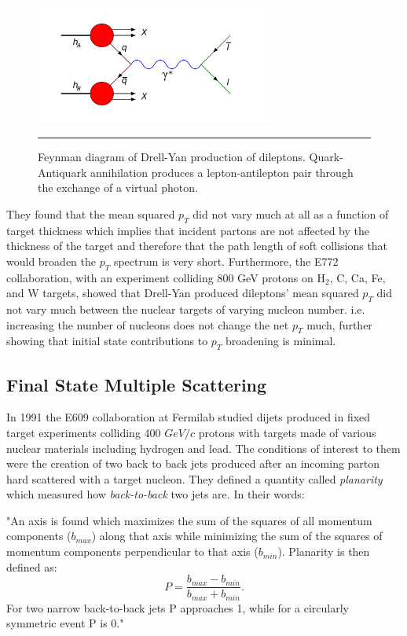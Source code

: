 \begin{figure}[htbp!]
  \centering
    \includegraphics[width=0.7\textwidth]{Figures/DYfeynman.png}
    \rule{35em}{0.5pt}
  \caption[Feynman diagram of Drell-Yan production of dileptons.]{Feynman diagram of Drell-Yan production of dileptons. Quark-Antiquark annihilation produces a lepton-antilepton pair through the exchange of a virtual photon.\citep{PhysRevLett.25.316}}
  \label{fig:DYfeynman}
\end{figure}

They found that the mean squared $p_{T}$ did not vary much at all as a function of target thickness which implies that incident partons are not affected by the thickness of the target and therefore that the path length of soft collisions that would broaden the $p_{T}$ spectrum is very short. Furthermore, the E772 collaboration, with an experiment colliding 800 GeV protons on H$_{2}$, C, Ca, Fe, and W targets, showed that Drell-Yan produced dileptons’ mean squared $p_{T}$ did not vary much between the nuclear targets of varying nucleon number.\citep{PhysRevLett.66.2285} i.e. increasing the number of nucleons does not change the net $p_{T}$ much, further showing that initial state contributions to $p_{T}$ broadening is minimal.

\subsection{Final State Multiple Scattering}
In 1991 the E609 collaboration at Fermilab studied dijets produced in fixed target experiments colliding 400 $GeV/c$ protons with targets made of various nuclear materials including hydrogen and lead\citep{Corcoran:1990vq}. The conditions of interest to them were the creation of two back to back jets produced after an incoming parton hard scattered with a target nucleon. 
They defined a quantity called \textit{planarity} which measured how \textit{back-to-back} two jets are. In their words:
\begin{addmargin}[1.5em]{2em}
"An axis is found which maximizes the sum of the squares of all momentum components ($b_{max}$) along that axis while minimizing the sum of the squares of momentum components perpendicular to that axis ($b_{min}$). Planarity is then defined as: 
\begin{equation}
P = \frac{b_{max}-b_{min}}{b_{max}+b_{min}}.
\end{equation}
For two narrow back-to-back jets P approaches 1, while for a circularly symmetric event P is 0."
\end{addmargin}

